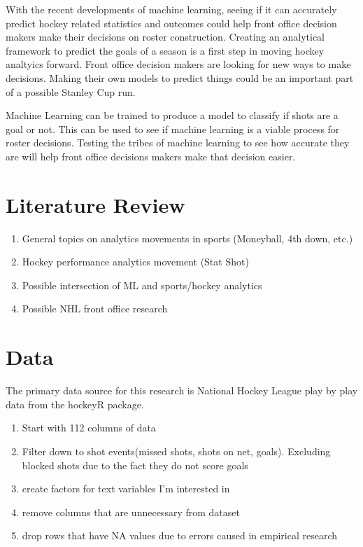 \documentclass[12pt,english]{article}
\begin{document}
With the recent developments of machine learning, seeing if it can accurately predict hockey related statistics and outcomes could help front office decision makers make their decisions on roster construction. Creating an analytical framework to predict the goals of a season is a first step in moving hockey analtyics forward. Front office decision makers are looking for new ways to make decisions. Making their own models to predict things could be an important part of a possible Stanley Cup run. 

Machine Learning can be trained to produce a model to classify if shots are a goal or not. This can be used to see if machine learning is a viable process for roster decisions. Testing the tribes of machine learning to see how accurate they are will help front office decisions makers make that decision easier.

\section{Literature Review}\label{sec:litreview}

\begin{enumerate}
    \item General topics on analytics movements in sports (Moneyball, 4th down, etc.)
    \item Hockey performance analytics movement (Stat Shot)
    \item Possible intersection of ML and sports/hockey analytics
    \item Possible NHL front office research
\end{enumerate}

\section{Data}\label{sec:data}
The primary data source for this research is National Hockey League play by play data from the hockeyR package. 

\begin{enumerate}
    \item Start with 112 columns of data
    \item Filter down to shot events(missed shots, shots on net, goals). Excluding blocked shots due to the fact they do not score goals
    \item create factors for text variables I'm interested in 
    \item remove columns that are unnecessary from dataset
    \item drop rows that have NA values due to errors caused in empirical research
\end{enumerate}
\end{document}

